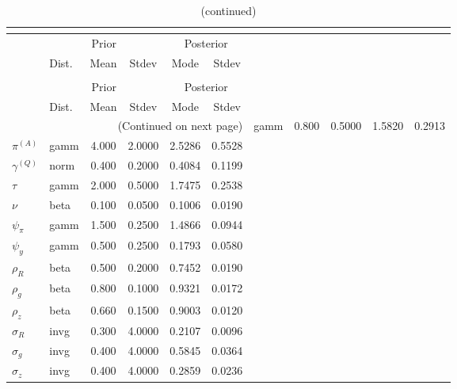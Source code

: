  
\begin{center}
\begin{longtable}{llcccc} 
\caption{Results from posterior maximization (parameters)}\\
 \label{Table:Posterior:1}\\
\toprule 
  & \multicolumn{3}{c}{Prior}  &  \multicolumn{2}{c}{Posterior} \\
  \cmidrule(r{.75em}){2-4} \cmidrule(r{.75em}){5-6}
  & Dist. & Mean  & Stdev & Mode & Stdev \\ 
\midrule \endfirsthead 
\caption{(continued)}\\
 \bottomrule 
  & \multicolumn{3}{c}{Prior}  &  \multicolumn{2}{c}{Posterior} \\
  \cmidrule(r{.75em}){2-4} \cmidrule(r{.75em}){5-6}
  & Dist. & Mean  & Stdev & Mode & Stdev \\ 
\midrule \endhead 
\bottomrule \multicolumn{6}{r}{(Continued on next page)}\endfoot 
\bottomrule\endlastfoot 
${r_{A}}$ & gamm &   0.800 & 0.5000 &   1.5820 &  0.2913 \\ 
${\pi^{(A)}}$ & gamm &   4.000 & 2.0000 &   2.5286 &  0.5528 \\ 
${\gamma^{(Q)}}$ & norm &   0.400 & 0.2000 &   0.4084 &  0.1199 \\ 
${\tau}$ & gamm &   2.000 & 0.5000 &   1.7475 &  0.2538 \\ 
${\nu}$ & beta &   0.100 & 0.0500 &   0.1006 &  0.0190 \\ 
${\psi_\pi}$ & gamm &   1.500 & 0.2500 &   1.4866 &  0.0944 \\ 
${\psi_y}$ & gamm &   0.500 & 0.2500 &   0.1793 &  0.0580 \\ 
${\rho_R}$ & beta &   0.500 & 0.2000 &   0.7452 &  0.0190 \\ 
${\rho_{g}}$ & beta &   0.800 & 0.1000 &   0.9321 &  0.0172 \\ 
${\rho_z}$ & beta &   0.660 & 0.1500 &   0.9003 &  0.0120 \\ 
${\sigma_R}$ & invg &   0.300 & 4.0000 &   0.2107 &  0.0096 \\ 
${\sigma_{g}}$ & invg &   0.400 & 4.0000 &   0.5845 &  0.0364 \\ 
${\sigma_z}$ & invg &   0.400 & 4.0000 &   0.2859 &  0.0236 \\ 
\end{longtable}
 \end{center}
